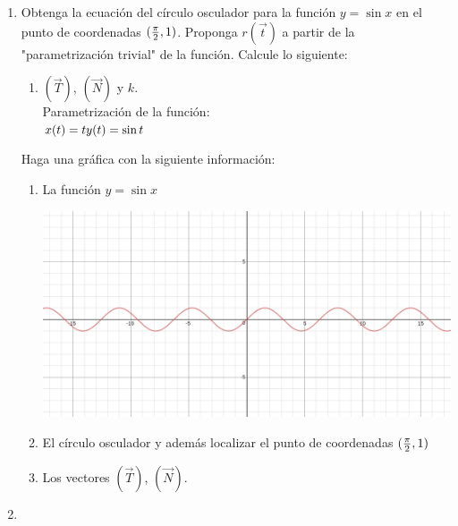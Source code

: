 \documentclass[10pt,letterpaper,fleqn]{article}
\begin{document}
\begin{enumerate}
        \item Obtenga la ecuación del círculo osculador para la función $y=\sin x$ en el punto de coordenadas $({\pi \over 2},1)$. Proponga $r(\overrightarrow{t})$ a partir de la "parametrización trivial" de la función. Calcule lo siguiente: 
        \begin{enumerate}
            \item $(\overrightarrow{T})$, $(\overrightarrow{N})$ y $k$.\\
            Parametrización de la función: \\
            $x(t) = t \\
             y(t) = \sin t$
        \end{enumerate}
        Haga una gráfica con la siguiente información:
        \begin{enumerate}
            \item La función $y=\sin x$ \\
            \begin{center}
                \includegraphics[scale=.3]{assets/img/ejercicio8(b).png}
            \end{center}
            \item El círculo osculador y además localizar el punto de coordenadas $({\pi \over 2},1)$
            \item Los vectores $(\overrightarrow{T})$, $(\overrightarrow{N})$.
        \end{enumerate}

        \item 


    \end{enumerate}
\end{document}
